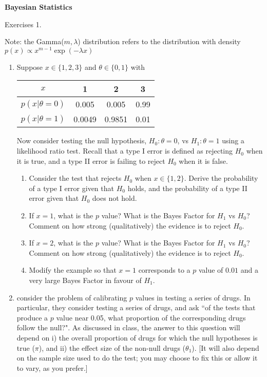 \documentclass[12pt]{article}
\begin{document}
\begin{center}
{\bf
Bayesian Statistics

\smallskip

Exercises 1.
}
\smallskip

\end{center}

\bigskip

Note: the Gamma($m,\lambda$) distribution refers
to the distribution with density $p(x) \propto x^{m-1} \exp(-\lambda x)$


\begin{enumerate}
\item Suppose $x \in \{1,2,3\}$ and $\theta \in \{0,1\}$ with 
\begin{table}[h!]
\center
\begin{tabular}{c|c|c|c}
$x$ & 1 & 2 & 3 \\ \hline
$p(x|\theta=0)$ & 0.005 & 0.005 & 0.99 \\
$p(x|\theta=1)$ & 0.0049 & 0.9851 & 0.01 
\end{tabular}
\end{table}

Now consider testing the null hypothesis, $H_0:\theta=0$, vs $H_1:\theta=1$ using a likelihood ratio test. 
Recall that a type I error is defined as
rejecting $H_0$ when it is true,
and a type II error is failing to reject $H_0$ when it is false.
\begin{enumerate}
\item Consider the test that rejects $H_0$ when $x \in \{1,2\}$. Derive the probability of a type I error given that $H_0$ holds, and the probability of a type II error given that $H_0$ does not hold.
\item If $x=1$, what is the $p$ value? What is the Bayes Factor for $H_1$ vs $H_0$? Comment on how strong (qualitatively) the evidence is to reject $H_0$.
\item If $x=2$, what is the $p$ value? What is the Bayes Factor for $H_1$ vs $H_0$? Comment on how strong (qualitatively) the evidence is to reject $H_0$.
\item Modify the example so that $x=1$ corresponds to a $p$ value of $0.01$ and a very large Bayes Factor in favour of $H_1$.
\end{enumerate}

\item \cite{sellke2001calibration} consider the problem of calibrating $p$ values in testing a series of drugs. In particular, they consider testing a series of drugs, and ask ``of the tests that produce a $p$ value near 0.05, what proportion of the corresponding drugs follow the null?". As discussed in class, the answer to this question will depend on i) the overall proportion of drugs for which the null hypotheses is true ($\pi$), and ii) the effect size of the non-null drugs ($\theta_1$). [It will also depend on the sample size used to do the test; you may choose to fix this or allow it to vary, as you prefer.]
 

\end{enumerate}
\end{document}

